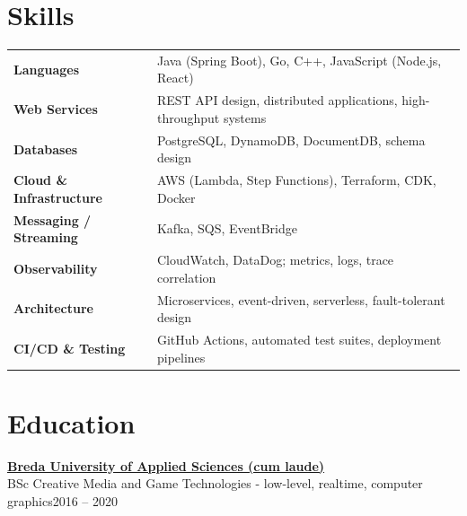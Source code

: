 \documentclass[11pt]{article}       %
\begin{document}
\section*{Skills}
\begin{tabular}{@{}l l@{}}
\textbf{Languages} & Java (Spring Boot), Go, C++, JavaScript (Node.js, React) \\
\textbf{Web Services} & REST API design, distributed applications, high-throughput systems \\
\textbf{Databases} & PostgreSQL, DynamoDB, DocumentDB, schema design \\
\textbf{Cloud \& Infrastructure} & AWS (Lambda, Step Functions), Terraform, CDK, Docker \\
\textbf{Messaging / Streaming} & Kafka, SQS, EventBridge \\
\textbf{Observability} & CloudWatch, DataDog; metrics, logs, trace correlation \\
\textbf{Architecture} & Microservices, event-driven, serverless, fault-tolerant design \\
\textbf{CI/CD \& Testing} & GitHub Actions, automated test suites, deployment pipelines \\
\end{tabular}

\section*{Education}

\textbf{\href{https://www.buas.nl/en/programmes/creative-media-and-game-technologies/programming}{Breda University of Applied Sciences (cum laude)}} \\
BSc Creative Media and Game Technologies - low-level, realtime, computer graphics\hfill 2016 -- 2020
\end{document}
